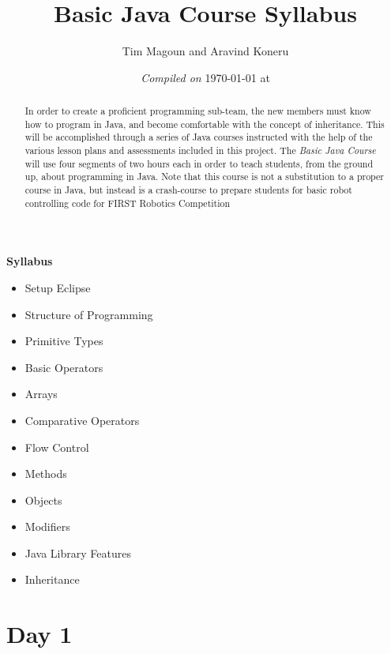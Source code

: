 \documentclass[11pt,fleqn]{article}
\begin{document}
\title{Basic Java Course Syllabus}%
\author{Tim Magoun and Aravind Koneru}
\date{\textit{Compiled on} \today \hspace{1mm} at \currenttime}
\maketitle

\begin{abstract}
In order to create a proficient programming sub-team, the new members must know how to program in Java, and become comfortable with the concept of inheritance. This will be accomplished through a series of Java courses instructed with the help of the various lesson plans and assessments included in this project. The \emph{Basic Java Course} will use four segments of two hours each in order to teach students, from the ground up, about programming in Java. Note that this course is not a substitution to a proper course in Java, but instead is a crash-course to prepare students for basic robot controlling code for FIRST\textsuperscript{\textregistered} Robotics Competition
\end{abstract}

\begin{center}
\textbf{Syllabus}
\end{center}

\begin{itemize}
\item Setup Eclipse
\item Structure of Programming
\item Primitive Types
\item Basic Operators
\item Arrays
\item Comparative Operators
\item Flow Control
\item Methods
\item Objects
\item Modifiers
\item Java Library Features
\item Inheritance
\end{itemize}

\newpage

\section*{Day 1}
\end{document}
